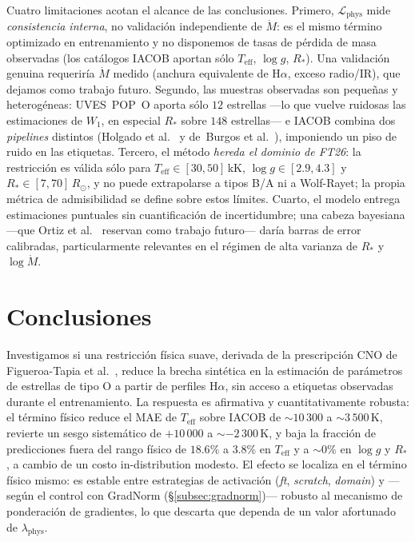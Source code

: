 \documentclass[sigconf,ACM]{acmart}
\begin{document}
Cuatro limitaciones acotan el alcance de las conclusiones. Primero,
$\mathcal{L}_\mathrm{phys}$ mide \emph{consistencia interna}, no validación
independiente de $\dot{M}$: es el mismo término optimizado en entrenamiento y no
disponemos de tasas de pérdida de masa observadas (los catálogos IACOB aportan sólo
$T_\mathrm{eff}$, $\log g$, $R_*$). Una validación genuina requeriría $\dot{M}$
medido (anchura equivalente de H$\alpha$, exceso radio/IR), que dejamos como trabajo
futuro. Segundo, las muestras observadas son pequeñas y heterogéneas: UVES~POP~O
aporta sólo $12$ estrellas ---lo que vuelve ruidosas las estimaciones de $W_1$, en
especial $R_*$ sobre $148$ estrellas--- e IACOB combina dos \emph{pipelines}
distintos (Holgado et al.~\cite{Holgado2025} y de~Burgos
et al.~\cite{deBurgos2024}), imponiendo un piso de ruido en las etiquetas. Tercero,
el método \emph{hereda el dominio de FT26}: la restricción es válida sólo para
$T_\mathrm{eff}\in[30,50]$\,kK, $\log g\in[2.9,4.3]$ y $R_*\in[7,70]\,R_\odot$, y no
puede extrapolarse a tipos B/A ni a Wolf-Rayet; la propia métrica de admisibilidad
se define sobre estos límites. Cuarto, el modelo entrega estimaciones puntuales sin
cuantificación de incertidumbre; una cabeza bayesiana ---que Ortiz
et al.~\cite{Ortiz2025} reservan como trabajo futuro--- daría barras de error
calibradas, particularmente relevantes en el régimen de alta varianza de $R_*$ y
$\log\dot{M}$.

\section{Conclusiones}

Investigamos si una restricción física suave, derivada de la prescripción CNO de
Figueroa-Tapia et al.~\cite{FigueroaTapia2026}, reduce la brecha sintética en la
estimación de parámetros de estrellas de tipo O a partir de perfiles H$\alpha$, sin
acceso a etiquetas observadas durante el entrenamiento. La respuesta es afirmativa y
cuantitativamente robusta: el término físico reduce el MAE de $T_\mathrm{eff}$ sobre
IACOB de ${\sim}10\,300$ a ${\sim}3\,500$\,K, revierte un sesgo sistemático de
$+10\,000$ a ${\sim}-2\,300$\,K, y baja la fracción de predicciones fuera del rango
físico de $18.6\%$ a $3.8\%$ en $T_\mathrm{eff}$ y a ${\sim}0\%$ en $\log g$ y $R_*$,
a cambio de un costo in-distribution modesto. El efecto se localiza en el término
físico mismo: es estable entre estrategias de activación (\emph{ft}, \emph{scratch},
\emph{domain}) y ---según el control con GradNorm (§\ref{subsec:gradnorm})--- robusto
al mecanismo de ponderación de gradientes, lo que descarta que dependa de un valor
afortunado de $\lambda_\mathrm{phys}$.
\end{document}
